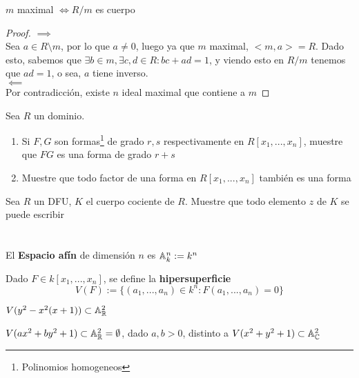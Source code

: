 \begin{thm}
    $m$ maximal $\iff R/m$  es cuerpo
\end{thm}
\begin{proof}
    $\implies$\\
    Sea $a\in R\setminus m$, por lo que $a\neq0$, luego ya que $m$ maximal, $<m, a>=R$. Dado esto, sabemos que $\exists b\in m, \exists c,d\in R: bc+ad=1$, y viendo esto en $R/m$ tenemos que $ad=1$, o sea, $a$ tiene inverso.\\
    $\impliedby$\\
    Por contradicción, existe $n$ ideal maximal que contiene a $m$
\end{proof}

\begin{prob}
    Sea $R$ un dominio.
    \begin{enumerate}
        \item Si $F,G$ son formas\footnote{Polinomios homogeneos} de grado $r,s$ respectivamente en $R[x_1,...,x_n]$, muestre que $FG$ es una forma de grado $r+s$
        \item Muestre que todo factor de una forma en $R[x_1,...,x_n]$ también es una forma
    \end{enumerate}
\end{prob}

\begin{prob}
    Sea $R$ un DFU, $K$ el cuerpo cociente de $R$. Muestre que todo elemento $z$ de $K$ se puede escribir
\end{prob}

\section{}
\begin{defn}
    El \textbf{Espacio afín} de  dimensión $n$ es $\mathbb{A}_k^n:=k^n$
\end{defn}
\begin{defn}[Hipersuperficie]
    Dado $F\in k[x_1,...,x_n]$, se define la \textbf{hipersuperficie}
    \[
        V(F):=\{(a_1,...,a_n)\in k^n: F(a_1,...,a_n)=0\}
    \]
\end{defn}

\begin{ejm}
    $V(y^2-x^2(x+1))\subset\mathbb{A}_{\mathbb{R}}^2$ %
\end{ejm}

\begin{ejm}
    $V(ax^2+by^2+1)\subset\mathbb{A}_{\mathbb{R}}^2=\emptyset$, dado $a,b>0$, distinto a $V(x^2+y^2+1)\subset\mathbb{A}_{\mathbb{C}}^2$
\end{ejm}

